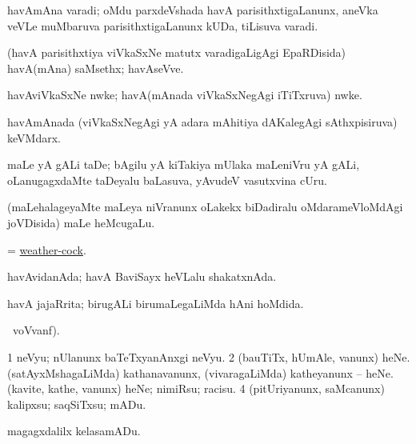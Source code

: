 \bentry
{} 
\gl{\nA}
\expl{}
\bmng
havAmAna varadi; oMdu parxdeVshada havA parisithxtigaLanunx, aneVka veVLe muMbaruva parisithxtigaLanunx kUDa, tiLisuva varadi. 
\emng
\eentry

\bentry
{} 
\gl{\nA}
\expl{}
\bmng
(havA parisithxtiya viVkaSxNe matutx varadigaLigAgi EpaRDisida) havA(mAna) saMsethx; havAseVve. 
\emng
\eentry

\bentry
{} 
\gl{\nA}
\expl{}
\bmng
havAviVkaSxNe nwke; havA(mAnada viVkaSxNegAgi iTiTxruva) nwke. 
\emng
\eentry

\bentry
{} 
\gl{\nA}
\expl{}
\bmng
havAmAnada (viVkaSxNegAgi yA adara mAhitiya dAKalegAgi sAthxpisiruva) keVMdarx. 
\emng
\eentry

\bentry
{} 
\gl{\nA}
\expl{}
\bmng
maLe yA gALi taDe; bAgilu yA kiTakiya mUlaka maLeniVru yA gALi, oLanugagxdaMte taDeyalu baLasuva, yAvudeV vasutxvina cUru. 
\emng
\eentry

\bentry
{} 
\gl{\nA}
\expl{}
\bmng
(maLehalageyaMte maLeya niVranunx oLakekx biDadiralu oMdarameVloMdAgi joVDisida) maLe heMcugaLu. 
\emng
\eentry

\bentry
{} 
\gl{\nA}
\expl{}
\bmng
= \hyperlink{weathercock}{weather-cock}. 
\emng
\eentry

\bentry
{} 
\gl{\gu}
\expl{}
\bmng
havAvidanAda; havA BaviSayx heVLalu shakatxnAda. 
\emng
\eentry

\bentry
{} 
\gl{\gu}
\expl{}
\bmng
havA jajaRrita; birugALi birumaLegaLiMda hAni hoMdida. 
\emng
\eentry

\bentry
{} 
\gl{\kirx}
 \ucAcx\ voVvanf).

\noindent
\gl{\sakirx}
\bmng
\bnum
\num{1} neVyu; nUlanunx baTeTxyanAnxgi neVyu. 
\num{2} (bauTiTx, hUmAle, \mo vanunx) heNe. 
\banum
{} (satAyxMshagaLiMda) kathanavanunx, (vivaragaLiMda) katheyanunx -- heNe. 
 (kavite, kathe, \mo vanunx) heNe; nimiRsu; racisu. 
\eanum
\numie
\num{4} (pitUriyanunx, saMcanunx) kalipxsu; saqSiTxsu; mADu. 
\enum
\emng

\noindent 
\gl{\akirx}
\expl{}
\bmng
magagxdalilx kelasamADu. 
\emng
\eentry

